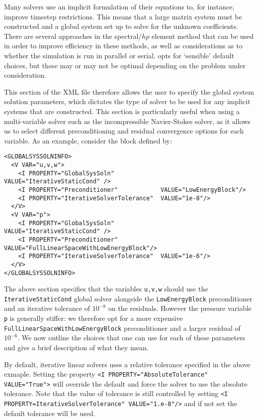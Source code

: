 Many \nekpp solvers use an implicit formulation of their equations to, for
instance, improve timestep restrictions. This means that a large matrix system
must be constructed and a global system set up to solve for the unknown
coefficients. There are several approaches in the spectral/$hp$ element method
that can be used in order to improve efficiency in these methods, as well as
considerations as to whether the simulation is run in parallel or serial. \nekpp
opts for `sensible' default choices, but these may or may not be optimal
depending on the problem under consideration.

This section of the XML file therefore allows the user to specify the global
system solution parameters, which dictates the type of solver to be used for any
implicit systems that are constructed. This section is particularly useful when
using a multi-variable solver such as the incompressible Navier-Stokes solver,
as it allows us to select different preconditioning and residual convergence
options for each variable. As an example, consider the block defined by:

\begin{lstlisting}[style=XMLStyle]
<GLOBALSYSSOLNINFO>
  <V VAR="u,v,w">
    <I PROPERTY="GlobalSysSoln"             VALUE="IterativeStaticCond" />
    <I PROPERTY="Preconditioner"            VALUE="LowEnergyBlock"/>
    <I PROPERTY="IterativeSolverTolerance"  VALUE="1e-8"/>
  </V>
  <V VAR="p">
    <I PROPERTY="GlobalSysSoln"             VALUE="IterativeStaticCond" />
    <I PROPERTY="Preconditioner"     VALUE="FullLinearSpaceWithLowEnergyBlock"/>
    <I PROPERTY="IterativeSolverTolerance"  VALUE="1e-6"/>
  </V>
</GLOBALSYSSOLNINFO>
\end{lstlisting}

The above section specifies that the variables \texttt{u,v,w} should use the
\texttt{IterativeStaticCond} global solver alongside the \texttt{LowEnergyBlock}
preconditioner and an iterative tolerance of $10^{-8}$ on the residuals. However
the pressure variable \texttt{p} is generally stiffer: we therefore opt for a
more expensive \texttt{FullLinearSpaceWithLowEnergyBlock} preconditioner and a
larger residual of $10^{-6}$. We now outline the choices that one can use for
each of these parameters and give a brief description of what they mean.

By default, iterative linear solvers uses a relative tolerance specified in the
above exmaple. Setting the property \texttt{<I PROPERTY="AbsoluteTolerance" VALUE="True">}
will override the default and force the solver to use the absolute tolerance.
Note that the value of tolerance is still
controlled by setting \texttt{<I PROPERTY=IterativeSolverTolerance" VALUE="1.e-8"/>}
and if not set the default tolerance will be used.

